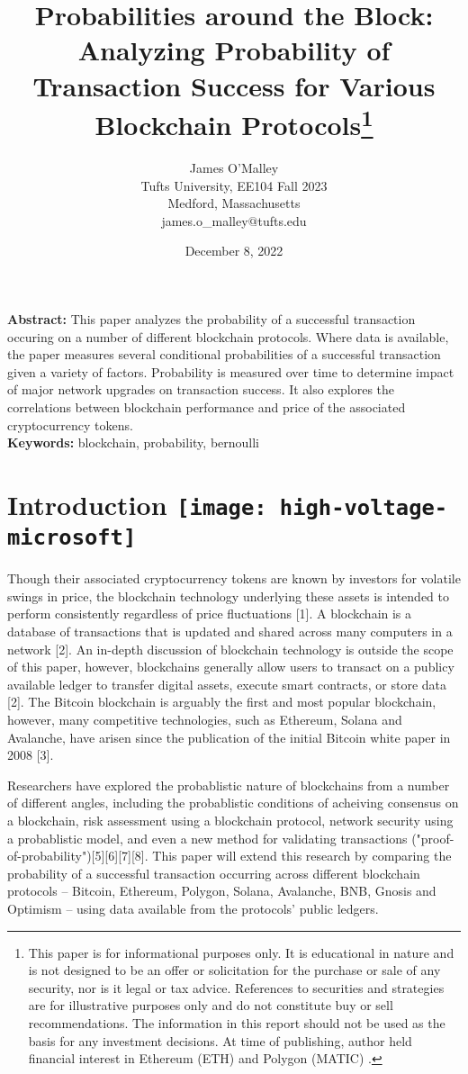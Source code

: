 \documentclass[12pt]{article}
\author{James O'Malley\\
Tufts University, EE104 Fall 2023\\
Medford, Massachusetts\\
james.o\_malley$@$tufts.edu}
\title{Probabilities around the Block: Analyzing Probability of Transaction Success for Various Blockchain Protocols\footnote{This paper is for informational purposes only. It is educational in nature and is not designed to be an offer or solicitation for the purchase or sale of any security, nor is it legal or tax advice. References to securities and strategies are for illustrative purposes only and do not constitute buy or sell recommendations. The information in this report should not be used as the basis for any investment decisions. At time of publishing, author held financial interest in Ethereum (ETH) and Polygon (MATIC) .}}
\date{December 8, 2022}
\begin{document}
\maketitle

\textbf{Abstract:} This paper analyzes the probability of a successful transaction occuring on a number of different blockchain protocols. Where data is available, the paper measures several conditional probabilities of a successful transaction given a variety of factors. Probability is measured over time to determine impact of major network upgrades on transaction success. It also explores the correlations between blockchain performance and price of the associated cryptocurrency tokens.\\

\textbf{Keywords:} blockchain, probability, bernoulli

\pagebreak

\section{Introduction \texttt{[image: high-voltage-microsoft]}}

Though their associated cryptocurrency tokens are known by investors for volatile swings in price, the blockchain technology underlying these assets is intended to perform consistently regardless of price fluctuations [1]. A blockchain is a database of transactions that is updated and shared across many computers in a network [2]. 
An in-depth discussion of blockchain technology is outside the scope of this paper, however, blockchains generally allow users to transact on a publicy available ledger to transfer digital assets, execute smart contracts, or store data [2]. The Bitcoin blockchain is arguably the first and most popular blockchain, however, many competitive technologies, such as Ethereum, Solana and Avalanche, have arisen since the publication of the initial Bitcoin white paper in 2008 [3].   

Researchers have explored the probablistic nature of blockchains from a number of different angles, including the probablistic conditions of acheiving consensus on a blockchain, risk assessment using a blockchain protocol, network security using a probablistic model, and even a new method for validating transactions ("proof-of-probability")[5][6][7][8]. This paper will extend this research by comparing the probability of a successful transaction occurring across different blockchain protocols -- Bitcoin, Ethereum, Polygon, Solana, Avalanche, BNB, Gnosis and Optimism -- using data available from the protocols' public ledgers. 
\end{document}
